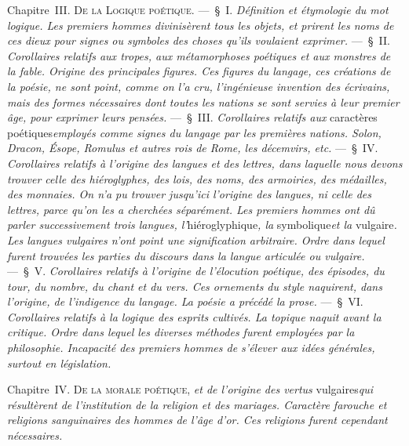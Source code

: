 \documentclass[french,twoside]{book} %
\begin{document}
Chapitre {\scshape III. De la Logique poétique.} — § I. {\itshape Définition et étymologie du mot logique. Les premiers hommes divinisèrent tous les objets, et prirent les noms de ces dieux pour signes ou symboles des choses qu’ils voulaient exprimer.} — § II. {\itshape Corollaires relatifs aux tropes, aux métamorphoses poétiques et aux monstres de la fable. Origine des principales figures. Ces figures du langage, ces créations de la poésie, ne sont point, comme on l’a cru, l’ingénieuse invention des écrivains, mais des formes nécessaires dont toutes les nations se sont servies à leur premier âge, pour exprimer leurs pensées.} — § III. {\itshape Corollaires relatifs aux} caractères poétiques{\itshape  employés comme signes du langage par les premières nations. Solon, Dracon, Ésope, Romulus et autres rois de Rome, les décemvirs, etc.} — § IV. {\itshape Corollaires relatifs à l’origine des langues et des lettres, dans laquelle nous}  {\itshape devons trouver celle des hiéroglyphes, des lois, des noms, des armoiries, des médailles, des monnaies. On n’a pu trouver jusqu’ici l’origine des langues, ni celle des lettres, parce qu’on les a cherchées séparément. Les premiers hommes ont dû parler successivement trois langues, l’}hiéroglyphique{\itshape , la} symbolique{\itshape  et la} vulgaire{\itshape . Les langues vulgaires n’ont point une signification arbitraire. Ordre dans lequel furent trouvées les parties du discours dans la langue articulée ou vulgaire.} — § V. {\itshape Corollaires relatifs à l’origine de l’élocution poétique, des épisodes, du tour, du nombre, du chant et du vers. Ces ornements du style naquirent, dans l’origine, de l’indigence du langage. La poésie a précédé la prose.} — § VI. {\itshape Corollaires relatifs à la logique des esprits cultivés. La topique naquit avant la critique. Ordre dans lequel les diverses méthodes furent employées par la philosophie. Incapacité des premiers hommes de s’élever aux idées générales, surtout en législation.}\par
Chapitre {\scshape IV. De la morale poétique}, {\itshape et de l’origine des vertus} vulgaires{\itshape  qui résultèrent de l’institution de la religion et des mariages. Caractère farouche et religions sanguinaires des hommes de l’âge d’or. Ces religions furent cependant nécessaires.}\par
\end{document}
